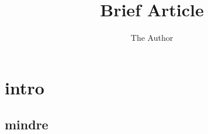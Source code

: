 \documentclass{article}   	%
\title{Brief Article}
\author{The Author}
\begin{document}
\maketitle

\section{intro}
\subsection{mindre}
\end{document}
